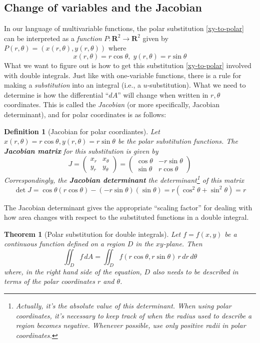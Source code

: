 \documentclass[12pt]{article}
\numberwithin{equation}{subsection}
\numberwithin{figure}{subsection}
\newtheorem{thm}[subsection]{Theorem}
\newtheorem{defn}[subsection]{Definition}
\theoremstyle{note}
\begin{document}
{\subsection{Change of variables and the Jacobian}
In our language of multivariable functions, the polar substitution \eqref{xy-to-polar} can be interpreted as a \textit{function} $P\colon \mathbf{R}^2\to\mathbf{R}^2$ given by $P(r,\theta)=(x(r,\theta), y(r,\theta))$ where \[x(r,\theta)=r\cos\theta,\; y(r,\theta)=r\sin\theta\] What we want to figure out is how to get this substitution \eqref{xy-to-polar} involved with double integrals. Just like with one-variable functions, there is a rule for making a \textit{substitution} into an integral (i.e., a $u$-substitution). What we need to determine is how the differential ``$dA$'' will change when written in $r,\theta$ coordinates. This is called the \textit{Jacobian} (or more specifically, Jacobian determinant), and for polar coordinates is as follows:



\begin{defn}[Jacobian for polar coordiantes]
Let $x(r,\theta)=r\cos\theta,y(r,\theta)=r\sin\theta$ be the polar substitution functions. The \textbf{Jacobian matrix} for this substitution is given by \begin{equation} J=\begin{pmatrix} x_r & x_{\theta} \\ y_r & y_{\theta} \end{pmatrix}=\begin{pmatrix} \cos\theta & -r\sin\theta \\ \sin\theta & r\cos\theta\end{pmatrix} \end{equation}
	Correspondingly, the \textbf{Jacobian determinant} the determinant\footnote{Actually, it's the \textit{absolute value} of this determinant. When using polar coordinates, it's necessary to keep track of when the radius used to describe a region becomes negative. Whenever possible, use only positive radii in polar coordinates.} of this matrix \[ \det J=\cos\theta (r\cos \theta)-(-r\sin\theta)(\sin\theta)=r(\cos^2\theta+\sin^2\theta)=r\]
\end{defn}

The Jacobian determinant gives the appropriate ``scaling factor'' for dealing with how area changes with respect to the substituted functions in a double integral. 

\begin{thm}[Polar substitution for double integrals] Let $f=f(x,y)$ be a continuous function defined on a region $D$ in the $xy$-plane. Then \begin{equation} \label{polar-sub} \iint_D f\,dA= \iint_D f(r\cos\theta, r\sin\theta)\, r\, dr\,d\theta\end{equation} where, in the right hand side of the equation, $D$ also needs to be described in terms of the polar coordinates $r$ and $\theta$.
\end{thm}

}
\end{document}
